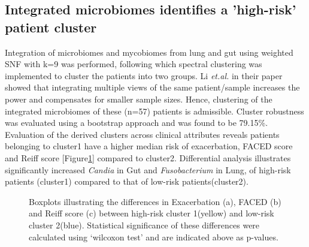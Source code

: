 \subsection{Integrated microbiomes identifies a 'high-risk' patient cluster}
Integration of microbiomes and mycobiomes from lung and gut using weighted SNF with k=9 was performed, following which spectral clustering was implemented to cluster the patients into two groups. Li \emph{et.al.} in their paper showed that integrating multiple views of the same patient/sample increases the power and compensates for smaller sample sizes\cite{Li2018}. Hence, clustering of the integrated microbiomes of these (n=57) patients is admissible. Cluster robustness was evaluated using a bootstrap approach and was found to be 79.15\%. Evaluation of the derived clusters across clinical attributes reveals patients belonging to cluster1 have a higher median risk of exacerbation, FACED score and Reiff score [Figure\ref{res2_fig4}] compared to cluster2. Differential analysis illustrates significantly increased \emph{Candia} in Gut and \emph{Fusobacterium} in Lung, of high-risk patients (cluster1) compared to that of low-risk patients(cluster2).

\begin{figure}[h]
	\centering
	\caption{Boxplots illustrating the differences in Exacerbation (a), FACED (b) and Reiff score (c) between high-risk cluster 1(yellow) and low-risk cluster 2(blue). Statistical significance of these differences were calculated using ‘wilcoxon test’ and are indicated above as p-values.}
	\label{res2_fig4}
\end{figure}

